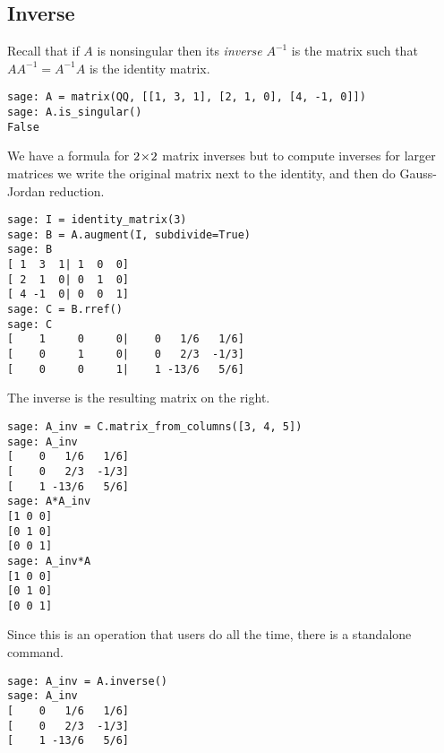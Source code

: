  


\subsection{Inverse}
Recall that if $A$ is nonsingular then its \textit{inverse} $A^{-1}$
is the matrix such that $AA^{-1}=A^{-1}A$ is the identity matrix. 
\begin{lstlisting}
sage: A = matrix(QQ, [[1, 3, 1], [2, 1, 0], [4, -1, 0]])
sage: A.is_singular()
False  
\end{lstlisting}
We have a formula for $2 \! \times \! 2$ matrix inverses
but to compute inverses for larger matrices 
we write the original matrix next to the identity, 
and then do Gauss-Jordan reduction.
\begin{lstlisting}
sage: I = identity_matrix(3)
sage: B = A.augment(I, subdivide=True)
sage: B
[ 1  3  1| 1  0  0]
[ 2  1  0| 0  1  0]
[ 4 -1  0| 0  0  1]
sage: C = B.rref()
sage: C
[    1     0     0|    0   1/6   1/6]
[    0     1     0|    0   2/3  -1/3]
[    0     0     1|    1 -13/6   5/6] 
\end{lstlisting}
The inverse is the resulting matrix on the right.
\begin{lstlisting}
sage: A_inv = C.matrix_from_columns([3, 4, 5])
sage: A_inv
[    0   1/6   1/6]
[    0   2/3  -1/3]
[    1 -13/6   5/6]
sage: A*A_inv
[1 0 0]
[0 1 0]
[0 0 1]
sage: A_inv*A
[1 0 0]
[0 1 0]
[0 0 1]  
\end{lstlisting}

Since this is an operation that \Sage{} users do all the time, there is a
standalone command.
\begin{lstlisting}
sage: A_inv = A.inverse()
sage: A_inv
[    0   1/6   1/6]
[    0   2/3  -1/3]
[    1 -13/6   5/6]  
\end{lstlisting}

